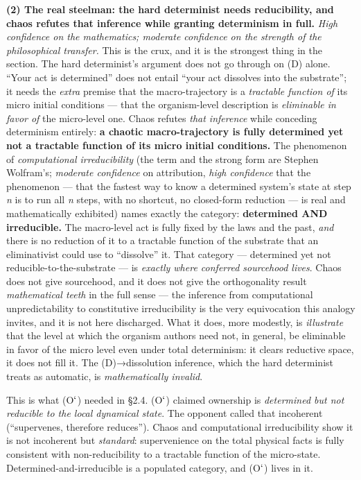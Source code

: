 \documentclass[11pt]{article}
\begin{document}
\textbf{(2) The real steelman: the hard determinist needs reducibility, and chaos refutes that inference while granting determinism in full.} \emph{High confidence on the mathematics; moderate confidence on the strength of the philosophical transfer.} This is the crux, and it is the strongest thing in the section. The hard determinist's argument does not go through on (D) alone. ``Your act is determined'' does not entail ``your act dissolves into the substrate''; it needs the \emph{extra} premise that the macro-trajectory is a \emph{tractable function of} its micro initial conditions — that the organism-level description is \emph{eliminable in favor of} the micro-level one. Chaos refutes \emph{that inference} while conceding determinism entirely: \textbf{a chaotic macro-trajectory is fully determined yet not a tractable function of its micro initial conditions.} The phenomenon of \emph{computational irreducibility} (the term and the strong form are Stephen Wolfram's; \emph{moderate confidence} on attribution, \emph{high confidence} that the phenomenon — that the fastest way to know a determined system's state at step \emph{n} is to run all \emph{n} steps, with no shortcut, no closed-form reduction — is real and mathematically exhibited) names exactly the category: \textbf{determined AND irreducible.} The macro-level act is fully fixed by the laws and the past, \emph{and} there is no reduction of it to a tractable function of the substrate that an eliminativist could use to ``dissolve'' it. That category — determined yet not reducible-to-the-substrate — is \emph{exactly where conferred sourcehood lives}. Chaos does not give sourcehood, and it does not give the orthogonality result \emph{mathematical teeth} in the full sense — the inference from computational unpredictability to constitutive irreducibility is the very equivocation this analogy invites, and it is not here discharged. What it does, more modestly, is \emph{illustrate} that the level at which the organism authors need not, in general, be eliminable in favor of the micro level even under total determinism: it clears reductive space, it does not fill it. The (D)→dissolution inference, which the hard determinist treats as automatic, is \emph{mathematically invalid}.

This is what (O\ensuremath{`}) needed in §2.4. (O\ensuremath{`}) claimed ownership is \emph{determined but not reducible to the local dynamical state}. The opponent called that incoherent (``supervenes, therefore reduces''). Chaos and computational irreducibility show it is not incoherent but \emph{standard}: supervenience on the total physical facts is fully consistent with non-reducibility to a tractable function of the micro-state. Determined-and-irreducible is a populated category, and (O\ensuremath{`}) lives in it.
\end{document}
